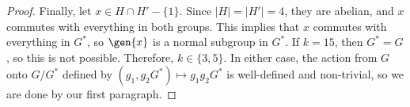 \begin{proof}
Finally, let $x\in H\cap H'-\{1\}$. Since $\vert H\vert = \vert H'\vert = 4$, they are abelian, and $x$ commutes with everything in both groups. This implies that $x$ commutes with everything in $G^*$, so $\gen{x}$ is a normal subgroup in $G^*$. If $k=15$, then $G^*=G$, so this is not possible. Therefore, $k\in\{3,5\}$. In either case, the action from $G$ onto $G/G^*$ defined by $(g_1, g_2G^*)\mapsto g_1g_2G^*$ is well-defined and non-trivial, so we are done by our first paragraph.  
\end{proof}